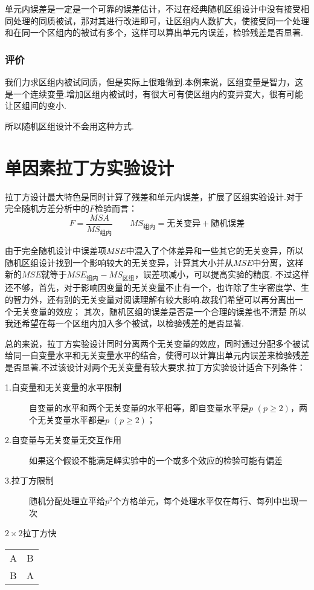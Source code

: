 单元内误差是一定是一个可靠的误差估计，不过在经典随机区组设计中没有接受相同处理的同质被试，那对其进行改进即可，让区组内人数扩大，使接受同一个处理和在同一个区组内的被试有多个，这样可以算出单元内误差，检验残差是否显著.

\subsubsection{评价}
我们力求区组内被试同质，但是实际上很难做到.本例来说，区组变量是智力，这是一个连续变量.增加区组内被试时，有很大可有使区组内的变异变大，很有可能让区组间的变小.

所以随机区组设计不会用这种方式.

\section{单因素拉丁方实验设计}

拉丁方设计最大特色是同时计算了残差和单元内误差，扩展了区组实验设计.对于完全随机方差分析中的$F$检验而言：
\[ F=\frac{MSA}{MS_{\text{组内}}} \qquad MS_{\text{组内}}=\text{无关变异}+\text{随机误差} \]

由于完全随机设计中误差项$MSE$中混入了个体差异和一些其它的无关变异，所以随机区组设计找到一个影响较大的无关变异，计算其大小并从$MSE$中分离，这样新的$MSE$就等于$MSE_{\text{组内}}-MS_{\text{区组}}$，误差项减小，可以提高实验的精度.
不过这样还不够，首先，对于影响因变量的无关变量不止有一个，也许除了生字密度学、生的智力外，还有别的无关变量对阅读理解有较大影响.故我们希望可以再分离出一个无关变量的效应；
其次，随机区组的误差是否是一个合理的误差也不清楚
所以我还希望在每一个区组内加入多个被试，以检验残差的是否显著.

总的来说，拉丁方实验设计同时分离两个无关变量的效应，同时通过分配多个被试给同一自变量水平和无关变量水平的结合，使得可以计算出单元内误差来检验残差是否显著.不过该设计对两个无关变量有较大要求.拉丁方实验设计适合下列条件：

\begin{description}
\item[1.自变量和无关变量的水平限制] 自变量的水平和两个无关变量的水平相等，即自变量水平是$p$ $(p\geq 2)$，两个无关变量水平都是$p$ $(p\geq 2)$；
\item[2.自变量与无关变量无交互作用] 如果这个假设不能满足峄实验中的一个或多个效应的检验可能有偏差
\item[3.拉丁方限制]随机分配处理立平给$p^2$个方格单元，每个处理水平仅在每行、每列中出现一次
\end{description}

\begin{margintable}
  \caption{$2\times 2$拉丁方快}
    \begin{tabular}{cc}
    A     & B \\
    B     & A \\
    \end{tabular}
\end{margintable}

